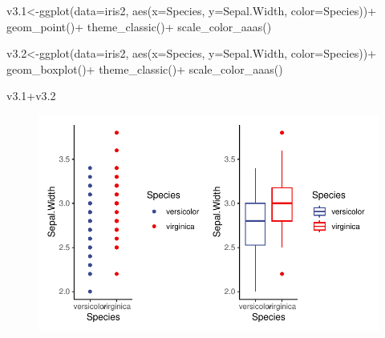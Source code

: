 \documentclass[
  letterpaper,
  DIV=11,
  numbers=noendperiod]{scrartcl}
\newenvironment{Shaded}{\begin{snugshade}}{\end{snugshade}}
\newcommand{\AttributeTok}[1]{\textcolor[rgb]{0.40,0.45,0.13}{#1}}
\newcommand{\FloatTok}[1]{\textcolor[rgb]{0.68,0.00,0.00}{#1}}
\newcommand{\FunctionTok}[1]{\textcolor[rgb]{0.28,0.35,0.67}{#1}}
\newcommand{\NormalTok}[1]{\textcolor[rgb]{0.00,0.23,0.31}{#1}}
\newcommand{\OtherTok}[1]{\textcolor[rgb]{0.00,0.23,0.31}{#1}}
\newcommand{\SpecialCharTok}[1]{\textcolor[rgb]{0.37,0.37,0.37}{#1}}
\begin{document}
\begin{Shaded}
\begin{Highlighting}[]
\NormalTok{v3}\FloatTok{.1}\OtherTok{\textless{}{-}}\FunctionTok{ggplot}\NormalTok{(}\AttributeTok{data=}\NormalTok{iris2, }\FunctionTok{aes}\NormalTok{(}\AttributeTok{x=}\NormalTok{Species, }\AttributeTok{y=}\NormalTok{Sepal.Width, }\AttributeTok{color=}\NormalTok{Species))}\SpecialCharTok{+}
  \FunctionTok{geom\_point}\NormalTok{()}\SpecialCharTok{+}
  \FunctionTok{theme\_classic}\NormalTok{()}\SpecialCharTok{+}
  \FunctionTok{scale\_color\_aaas}\NormalTok{()}

\NormalTok{v3}\FloatTok{.2}\OtherTok{\textless{}{-}}\FunctionTok{ggplot}\NormalTok{(}\AttributeTok{data=}\NormalTok{iris2, }\FunctionTok{aes}\NormalTok{(}\AttributeTok{x=}\NormalTok{Species, }\AttributeTok{y=}\NormalTok{Sepal.Width, }\AttributeTok{color=}\NormalTok{Species))}\SpecialCharTok{+}
  \FunctionTok{geom\_boxplot}\NormalTok{()}\SpecialCharTok{+}
  \FunctionTok{theme\_classic}\NormalTok{()}\SpecialCharTok{+}
  \FunctionTok{scale\_color\_aaas}\NormalTok{()}

\NormalTok{v3}\FloatTok{.1}\SpecialCharTok{+}\NormalTok{v3}\FloatTok{.2}
\end{Highlighting}
\end{Shaded}

\begin{figure}[H]

{\centering \includegraphics{t_test_files/figure-pdf/unnamed-chunk-13-1.pdf}

}

\end{figure}
\end{document}
